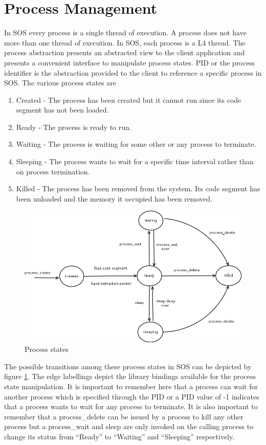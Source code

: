 \documentclass[a4paper, 11pt]{article}
\begin{document}
\section{Process Management}
In SOS every process is a single thread of execution. A process does
not have more than one thread of execution. In SOS, each process is a
L4 thread. The process abstraction presents an abstracted view to the
client application and presents a convenient interface to
manipulate process states. PID or the process identifier is the
abstraction provided to the client to reference a specific process in
SOS. The various process states are
\begin{enumerate}
\item Created - The process has been created but it cannot run since
  its code segment has not been loaded.
\item Ready - The process is ready to run.
\item Waiting - The process is waiting for some other or any process
  to terminate.
\item Sleeping - The process wants to wait for a specific time
  interval rather than on process termination.
\item Killed - The process has been removed from the system. Its code
  segment has been unloaded and the memory it occupied has been
  removed.
\end{enumerate}

\begin{figure}
\begin{center}
\includegraphics[scale=0.5]{process-states.png}
\end{center}
\caption{Process states}
\label{process-states-fig}
\end{figure}

The possible transitions among these process states in SOS can be
depicted by figure \ref{process-states-fig}. The edge labellings
depict the library bindings available for the process state
manipulation. It is important to remember here that a process can wait
for another process which is specified through the PID or a PID value
of -1 indicates that a process wants to wait for any process to
terminate. It is also important to remember that a process\_delete can be
issued by a process to kill any other process but a process\_wait and
sleep are only invoked on the calling process to change its status
from ``Ready'' to ``Waiting'' and ``Sleeping'' respectively. 
\end{document}
